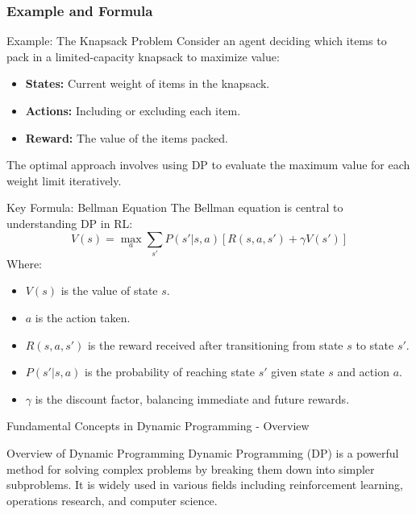 \documentclass[aspectratio=169]{beamer}
\begin{document}
\begin{frame}[fragile]
    \frametitle{Example and Formula}
    \begin{block}{Example: The Knapsack Problem}
        Consider an agent deciding which items to pack in a limited-capacity knapsack to maximize value:
        \begin{itemize}
            \item \textbf{States:} Current weight of items in the knapsack.
            \item \textbf{Actions:} Including or excluding each item.
            \item \textbf{Reward:} The value of the items packed.
        \end{itemize}
        The optimal approach involves using DP to evaluate the maximum value for each weight limit iteratively.
    \end{block}
    
    \begin{block}{Key Formula: Bellman Equation}
        The Bellman equation is central to understanding DP in RL:
        \begin{equation}
        V(s) = \max_a \sum_{s'} P(s'|s,a) [R(s,a,s') + \gamma V(s')]
        \end{equation}
        Where:
        \begin{itemize}
            \item $V(s)$ is the value of state $s$.
            \item $a$ is the action taken.
            \item $R(s,a,s')$ is the reward received after transitioning from state $s$ to state $s'$.
            \item $P(s'|s,a)$ is the probability of reaching state $s'$ given state $s$ and action $a$.
            \item $\gamma$ is the discount factor, balancing immediate and future rewards.
        \end{itemize}
    \end{block}
\end{frame}

\begin{frame}[fragile]{Fundamental Concepts in Dynamic Programming - Overview}
    \begin{block}{Overview of Dynamic Programming}
        Dynamic Programming (DP) is a powerful method for solving complex problems by breaking them down into simpler subproblems. It is widely used in various fields including reinforcement learning, operations research, and computer science.
    \end{block}
\end{frame}
\end{document}
